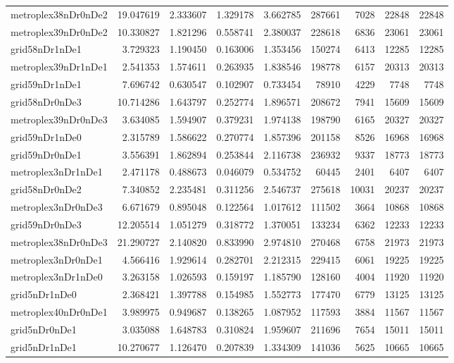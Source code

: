 \documentclass[../../../thesis.tex]{subfiles}
\begin{document}
\begin{longtable}{|l|r|r|r|r|r|r|r|r|}
metroplex38nDr0nDe2 & 19.047619 & 2.333607 & 1.329178 & 3.662785 & 287661 & 7028 & 22848 & 22848 \\
metroplex39nDr0nDe2 & 10.330827 & 1.821296 & 0.558741 & 2.380037 & 228618 & 6836 & 23061 & 23061 \\
grid58nDr1nDe1 & 3.729323 & 1.190450 & 0.163006 & 1.353456 & 150274 & 6413 & 12285 & 12285 \\
metroplex39nDr1nDe1 & 2.541353 & 1.574611 & 0.263935 & 1.838546 & 198778 & 6157 & 20313 & 20313 \\
grid59nDr1nDe1 & 7.696742 & 0.630547 & 0.102907 & 0.733454 & 78910 & 4229 & 7748 & 7748 \\
grid58nDr0nDe3 & 10.714286 & 1.643797 & 0.252774 & 1.896571 & 208672 & 7941 & 15609 & 15609 \\
metroplex39nDr0nDe3 & 3.634085 & 1.594907 & 0.379231 & 1.974138 & 198790 & 6165 & 20327 & 20327 \\
grid59nDr1nDe0 & 2.315789 & 1.586622 & 0.270774 & 1.857396 & 201158 & 8526 & 16968 & 16968 \\
grid59nDr0nDe1 & 3.556391 & 1.862894 & 0.253844 & 2.116738 & 236932 & 9337 & 18773 & 18773 \\
metroplex3nDr1nDe1 & 2.471178 & 0.488673 & 0.046079 & 0.534752 & 60445 & 2401 & 6407 & 6407 \\
grid58nDr0nDe2 & 7.340852 & 2.235481 & 0.311256 & 2.546737 & 275618 & 10031 & 20237 & 20237 \\
metroplex3nDr0nDe3 & 6.671679 & 0.895048 & 0.122564 & 1.017612 & 111502 & 3664 & 10868 & 10868 \\
grid59nDr0nDe3 & 12.205514 & 1.051279 & 0.318772 & 1.370051 & 133234 & 6362 & 12233 & 12233 \\
metroplex38nDr0nDe3 & 21.290727 & 2.140820 & 0.833990 & 2.974810 & 270468 & 6758 & 21973 & 21973 \\
metroplex3nDr0nDe1 & 4.566416 & 1.929614 & 0.282701 & 2.212315 & 229415 & 6061 & 19225 & 19225 \\
metroplex3nDr1nDe0 & 3.263158 & 1.026593 & 0.159197 & 1.185790 & 128160 & 4004 & 11920 & 11920 \\
grid5nDr1nDe0 & 2.368421 & 1.397788 & 0.154985 & 1.552773 & 177470 & 6779 & 13125 & 13125 \\
metroplex40nDr0nDe1 & 3.989975 & 0.949687 & 0.138265 & 1.087952 & 117593 & 3884 & 11567 & 11567 \\
grid5nDr0nDe1 & 3.035088 & 1.648783 & 0.310824 & 1.959607 & 211696 & 7654 & 15011 & 15011 \\
grid5nDr1nDe1 & 10.270677 & 1.126470 & 0.207839 & 1.334309 & 141036 & 5625 & 10665 & 10665 \\

\end{longtable}
\end{document}
